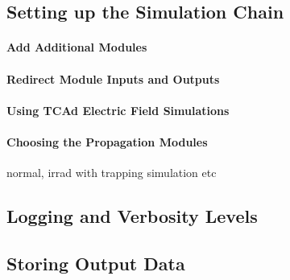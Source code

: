 \subsection{Setting up the Simulation Chain}
\paragraph{Add Additional Modules}
\paragraph{Redirect Module Inputs and Outputs}
\paragraph{Using TCAd Electric Field Simulations}
\paragraph{Choosing the Propagation Modules}
normal, irrad with trapping simulation etc
\subsection{Logging and Verbosity Levels}
\label{sec:logging_verbosity}
\subsection{Storing Output Data}
